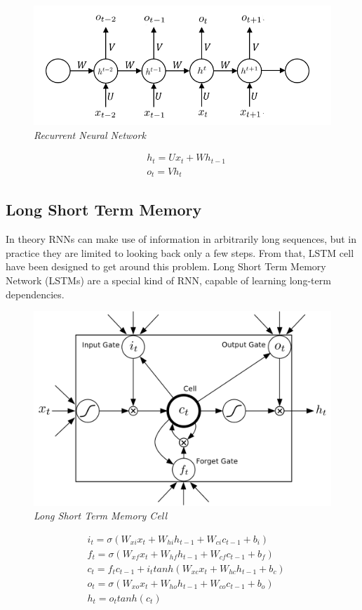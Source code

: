 \documentclass[conference]{IEEEtran}
\begin{document}
\begin{figure}[h]
\includegraphics[scale=0.5]{rnn.png}
\centering
\caption{\textit{Recurrent Neural Network}}
\end{figure}
\begin{align*}
	&h_t = Ux_t + Wh_{t-1}\\
	&o_t = Vh_t
\end{align*}


\subsection{Long Short Term Memory}
In theory RNNs can make use of information in arbitrarily long sequences, but in practice they are limited to looking back only a few steps. From that, LSTM cell have been designed to get around this problem. Long Short Term Memory Network (LSTMs) are a special kind of RNN, capable of learning long-term dependencies.

\begin{figure}[h]
\includegraphics[scale=0.5]{lstm.png}
\centering
\caption{\textit{Long Short Term Memory Cell}}
\end{figure}

\begin{align*}
     &i_t = \sigma (W_{xi}x_t + W_{hi}h_{t-1} + W_{ci}c_{t-1} + b_i) \\
     &f_t = \sigma (W_{xf}x_t + W_{hf}h_{t-1} + W_{cf}c_{t-1} + b_f) \\
     &c_t = f_tc_{t-1} + i_t tanh(W_{xc}x_t + W_{hc}h_{t-1} + b_c) \\
     &o_t = \sigma (W_{xo}x_t + W_{ho}h_{t-1} + W_{co}c_{t-1} + b_o) \\
     &h_t = o_t tanh(c_t)
\end{align*} 
\end{document}
